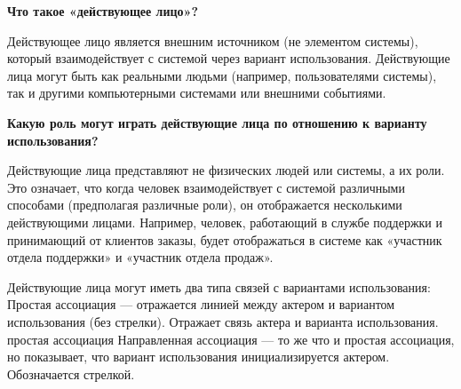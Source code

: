 \textbf{Что такое «действующее лицо»?}\par
Действующее лицо является внешним источником (не элементом системы),
который взаимодействует с системой через вариант использования.
Действующие лица могут быть как реальными людьми (например, пользователями системы),
так и другими компьютерными системами или внешними событиями.\par
\vfill
\textbf{Какую роль могут играть действующие лица по отношению к варианту использования?}\par
Действующие лица представляют не физических людей или системы, а их роли.
Это означает, что когда человек взаимодействует с системой различными способами (предполагая различные роли),
он отображается несколькими действующими лицами.
Например, человек, работающий в службе поддержки и принимающий от клиентов заказы,
будет отображаться в системе как «участник отдела поддержки» и «участник отдела продаж».\par
Действующие лица могут иметь два типа связей с вариантами использования:
Простая ассоциация — отражается линией между актером и вариантом использования (без стрелки).
Отражает связь актера и варианта использования.
простая ассоциация
Направленная ассоциация — то же что и простая ассоциация, но показывает, что вариант использования инициализируется актером.
Обозначается стрелкой.